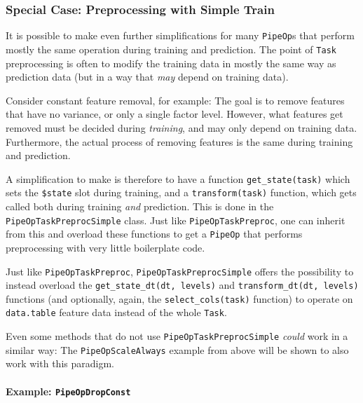 \documentclass[]{article}
\let\oldparagraph\paragraph
\renewcommand{\paragraph}[1]{\oldparagraph{#1}\mbox{}}
\begin{document}
\hypertarget{special-case-preprocessing-with-simple-train}{%
\subsubsection{Special Case: Preprocessing with Simple Train}\label{special-case-preprocessing-with-simple-train}}

It is possible to make even further simplifications for many \texttt{PipeOp}s that perform mostly the same operation during training and prediction.
The point of \texttt{Task} preprocessing is often to modify the training data in mostly the same way as prediction data (but in a way that \emph{may} depend on training data).

Consider constant feature removal, for example: The goal is to remove features that have no variance, or only a single factor level.
However, what features get removed must be decided during \emph{training}, and may only depend on training data.
Furthermore, the actual process of removing features is the same during training and prediction.

A simplification to make is therefore to have a function \texttt{get\_state(task)} which sets the \texttt{\$state} slot during training, and a \texttt{transform(task)} function, which gets called both during training \emph{and} prediction.
This is done in the \texttt{PipeOpTaskPreprocSimple} class.
Just like \texttt{PipeOpTaskPreproc}, one can inherit from this and overload these functions to get a \texttt{PipeOp} that performs preprocessing with very little boilerplate code.

Just like \texttt{PipeOpTaskPreproc}, \texttt{PipeOpTaskPreprocSimple} offers the possibility to instead overload the \texttt{get\_state\_dt(dt,\ levels)} and \texttt{transform\_dt(dt,\ levels)} functions (and optionally, again, the \texttt{select\_cols(task)} function) to operate on \texttt{data.table} feature data instead of the whole \texttt{Task}.

Even some methods that do not use \texttt{PipeOpTaskPreprocSimple} \emph{could} work in a similar way: The \texttt{PipeOpScaleAlways} example from above will be shown to also work with this paradigm.

\hypertarget{example-pipeopdropconst}{%
\paragraph{\texorpdfstring{Example: \texttt{PipeOpDropConst}}{Example: PipeOpDropConst}}\label{example-pipeopdropconst}}
\end{document}

